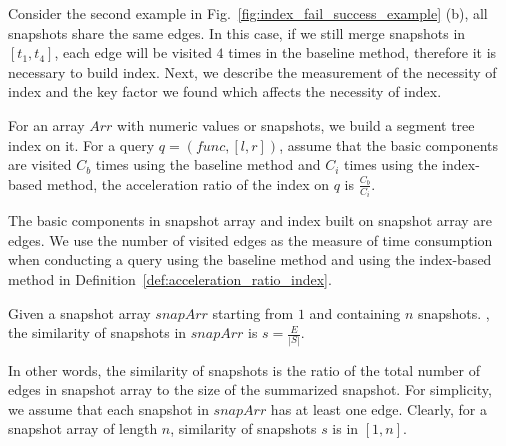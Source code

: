 \documentclass[10pt,journal,compsoc]{IEEEtran}
\begin{document}
Consider the second example in Fig.~\ref{fig:index_fail_success_example} (b), all snapshots share the same edges. In this case, if we still merge snapshots in $ [t_1,t_4] $, each edge will be visited $ 4 $ times in the baseline method, therefore it is necessary to build index. Next, we describe the measurement of the necessity of index and the key factor we found which affects the necessity of index.
\begin{definition}
	\label{def:acceleration_ratio_index}
	For an array $ Arr $ with numeric values or snapshots, we build a segment tree index on it. For a query $ q=(func,[l,r]) $, assume that the basic components are visited $ C_b $ times using the baseline method and $ C_i $ times using the index-based method, the acceleration ratio of the index on $ q $ is $ \frac{C_b}{C_i} $.
\end{definition}
The basic components in snapshot array and index built on snapshot array are edges. We use the number of visited edges as the measure of time consumption when conducting a query using the baseline method and using the index-based method in Definition~\ref{def:acceleration_ratio_index}.
\begin{definition}
	\label{def:similarity_snapshots}
	Given a snapshot array $ snapArr $ starting from $ 1 $ and containing $ n $ snapshots. , the similarity of snapshots in $ snapArr $ is $ s=\frac{E}{|S|} $.
\end{definition}
In other words, the similarity of snapshots is the ratio of the total number of edges in snapshot array to the size of the summarized snapshot. For simplicity, we assume that each snapshot in $ snapArr $ has at least one edge. Clearly, for a snapshot array of length $ n $, similarity of snapshots $ s $ is in $ [1,n] $.
\end{document}
